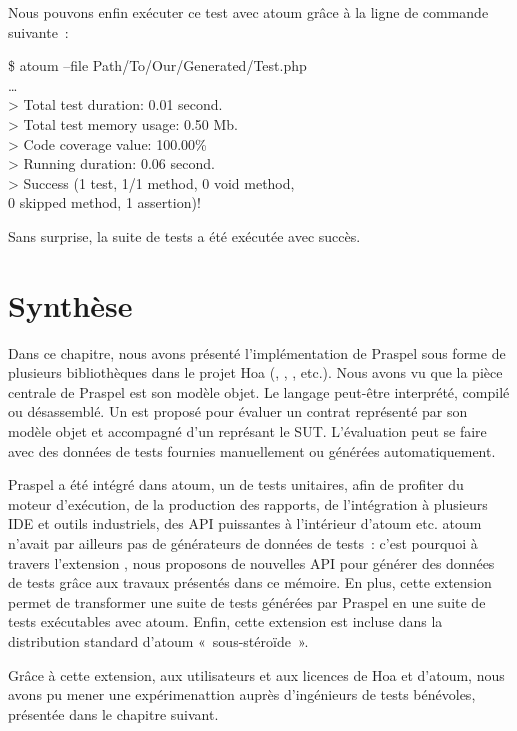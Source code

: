\noindent Nous pouvons enfin exécuter ce test avec atoum grâce à la ligne de
commande suivante~:
%
\begin{pre}
\$ atoum --file Path/To/Our/Generated/Test.php \\
… \\
> Total test duration: 0.01 second. \\
> Total test memory usage: 0.50 Mb. \\
> Code coverage value: 100.00\% \\
> Running duration: 0.06 second. \\
> Success (1 test, 1/1 method, 0 void method, \\
           0 skipped method, 1 assertion)!
\end{pre}
%
Sans surprise, la suite de tests a été exécutée avec succès.

\section{Synthèse}

Dans ce chapitre, nous avons présenté l'implémentation de Praspel sous forme de
plusieurs bibliothèques dans le projet Hoa (,
, ,
 etc.). Nous avons vu que la pièce centrale de Praspel
est son modèle objet. Le langage peut-être interprété, compilé ou désassemblé.
Un  est proposé pour évaluer un contrat
représenté par son modèle objet et accompagné d'un 
représant le SUT. L'évaluation peut se faire avec des données de tests fournies
manuellement ou générées automatiquement.

Praspel a été intégré dans atoum, un  de tests unitaires,
afin de profiter du moteur d'exécution, de la production des rapports, de
l'intégration à plusieurs IDE et outils industriels, des API puissantes à
l'intérieur d'atoum etc. atoum n'avait par ailleurs pas de générateurs de
données de tests~: c'est pourquoi à travers l'extension
, nous proposons de nouvelles API pour
générer des données de tests grâce aux travaux présentés dans ce mémoire. En
plus, cette extension permet de transformer une suite de tests générées par
Praspel en une suite de tests exécutables avec atoum. Enfin, cette extension est
incluse dans la distribution standard d'atoum «~sous-stéroïde~».

Grâce à cette extension, aux utilisateurs et aux licences
 de Hoa et d'atoum, nous avons pu mener une
expérimenattion auprès d'ingénieurs de tests bénévoles, présentée dans le
chapitre suivant.
